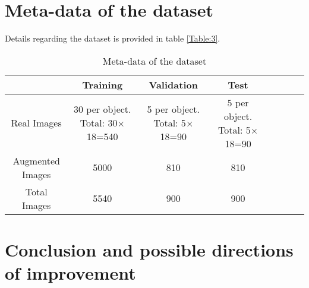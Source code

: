 \documentclass[paper=a4,11pt,parskip=half,toc=listof]{scrartcl}
\begin{document}
	
\section{Meta-data of the dataset}

Details regarding the dataset is provided in table \ref{Table:3}.

\begin{table}[!htb]
\centering
\begin{tabular}{|c|c|c|c|c|c|c|c|}
\hline 
    & Training & Validation & Test \\ 
\hline 
Real Images & \makecell{30 per object.\\ Total: 30$\times$18=540} & \makecell{5 per object.\\ Total: 5$\times$18=90} & \makecell{5 per object.\\ Total: 5$\times$18=90} \\ 
\hline 
Augmented Images & 5000 & 810 & 810 \\ 
\hline 
Total Images & 5540 & 900 & 900 \\ 
\hline 
\end{tabular}
\caption{Meta-data of the dataset} 
\label{Table:4}
\end{table}

\section{Conclusion and possible directions of improvement}
\end{document}
